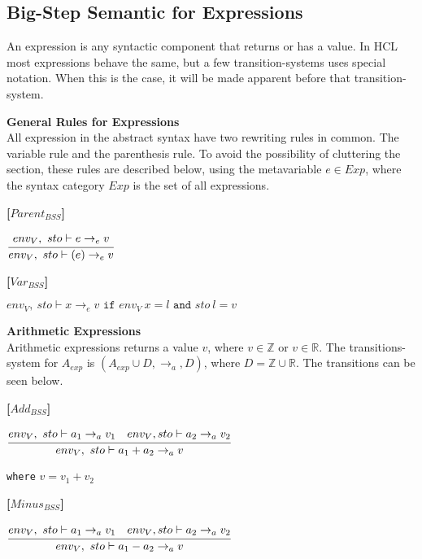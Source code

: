 {\subsection{Big-Step Semantic for Expressions}
An expression is any syntactic component that returns or has a value. In HCL most expressions behave the same, but a few transition-systems uses special notation.
When this is the case, it will be made apparent before that transition-system.

\textbf{\large{General Rules for Expressions}} \\
All expression in the abstract syntax have two rewriting rules in common.
The variable rule and the parenthesis rule.
To avoid the possibility of cluttering the section, these rules are described below, using the metavariable $e \in Exp$, where the syntax category $Exp$ is the set of all expressions.

\textbf{[$Parent_{BSS}$]}
\begin{center}
	\begin{math}
	\cfrac
		{env_V,\ sto \vdash e \rightarrow_e v}
		{env_V,\ sto \vdash (e) \rightarrow_e v}
	\end{math}
\end{center}

\textbf{[$Var_{BSS}$]}
\begin{center}
	\begin{math}
	env_V,\ sto \vdash x \rightarrow_e v
	\texttt{ if } env_V\ x = l
	\texttt{ and } sto\ l = v
	\end{math}
\end{center}

\textbf{\large{Arithmetic Expressions}}\\
Arithmetic expressions returns a value $v$, where $v \in \mathbb{Z}$ or $v \in \mathbb{R}$.
The transitions-system for $A_{exp}$ is $(A_{exp} \cup D, \rightarrow_a, D)$, 
where $D = \mathbb{Z} \cup \mathbb{R}$.
The transitions can be seen below.

\textbf{[$Add_{BSS}$]}\\
\begin{center}
	\begin{math}
	\cfrac
		{env_V,\ sto \vdash a_1 \rightarrow_a v_1 \quad env_V, sto \vdash a_2 \rightarrow_a v_2}
		{env_V,\ sto \vdash a_1 + a_2 \rightarrow_a v}
	\end{math}
	
	
	\texttt{where} $v = v_1 + v_2$
\end{center}

\textbf{[$Minus_{BSS}$]}\\
\begin{center}
	\begin{math}
	\cfrac
		{env_V,\ sto \vdash a_1 \rightarrow_a v_1 \quad env_V, sto \vdash a_2 \rightarrow_a v_2}
		{env_V,\ sto \vdash a_1 - a_2 \rightarrow_a v}
	\end{math}
	

\end{center}}
